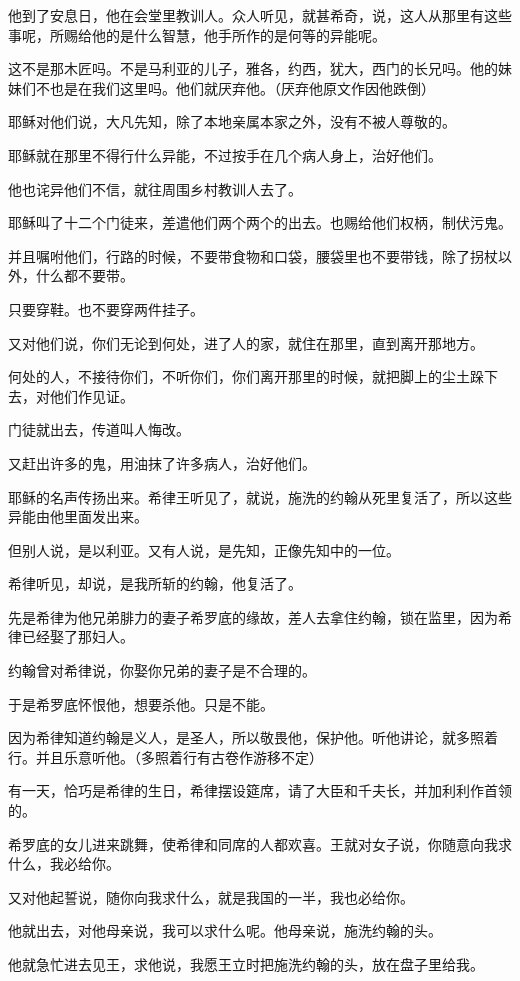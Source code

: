 \documentclass[12pt,oneside]{book}
\begin{document}
他到了安息日，他在会堂里教训人。众人听见，就甚希奇，说，这人从那里有这些事呢，所赐给他的是什么智慧，他手所作的是何等的异能呢。

这不是那木匠吗。不是马利亚的儿子，雅各，约西，犹大，西门的长兄吗。他的妹妹们不也是在我们这里吗。他们就厌弃他。（厌弃他原文作因他跌倒）

耶稣对他们说，大凡先知，除了本地亲属本家之外，没有不被人尊敬的。

耶稣就在那里不得行什么异能，不过按手在几个病人身上，治好他们。

他也诧异他们不信，就往周围乡村教训人去了。

耶稣叫了十二个门徒来，差遣他们两个两个的出去。也赐给他们权柄，制伏污鬼。

并且嘱咐他们，行路的时候，不要带食物和口袋，腰袋里也不要带钱，除了拐杖以外，什么都不要带。

只要穿鞋。也不要穿两件挂子。

又对他们说，你们无论到何处，进了人的家，就住在那里，直到离开那地方。

何处的人，不接待你们，不听你们，你们离开那里的时候，就把脚上的尘土跺下去，对他们作见证。

门徒就出去，传道叫人悔改。

又赶出许多的鬼，用油抹了许多病人，治好他们。

耶稣的名声传扬出来。希律王听见了，就说，施洗的约翰从死里复活了，所以这些异能由他里面发出来。

但别人说，是以利亚。又有人说，是先知，正像先知中的一位。

希律听见，却说，是我所斩的约翰，他复活了。

先是希律为他兄弟腓力的妻子希罗底的缘故，差人去拿住约翰，锁在监里，因为希律已经娶了那妇人。

约翰曾对希律说，你娶你兄弟的妻子是不合理的。

于是希罗底怀恨他，想要杀他。只是不能。

因为希律知道约翰是义人，是圣人，所以敬畏他，保护他。听他讲论，就多照着行。并且乐意听他。（多照着行有古卷作游移不定）

有一天，恰巧是希律的生日，希律摆设筵席，请了大臣和千夫长，并加利利作首领的。

希罗底的女儿进来跳舞，使希律和同席的人都欢喜。王就对女子说，你随意向我求什么，我必给你。

又对他起誓说，随你向我求什么，就是我国的一半，我也必给你。

他就出去，对他母亲说，我可以求什么呢。他母亲说，施洗约翰的头。

他就急忙进去见王，求他说，我愿王立时把施洗约翰的头，放在盘子里给我。
\end{document}
